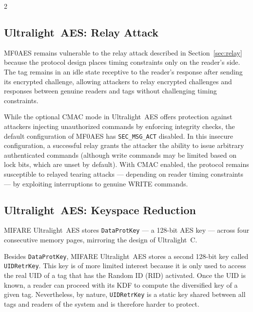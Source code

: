 \documentclass[10pt,letterpaper]{article}
\begin{document}
\begin{multicols}{2}
\subsection{Ultralight~AES: Relay Attack}
\label{sec:aesrelay}

MF0AES remains vulnerable to the relay attack described in Section~\ref{sec:relay} because the protocol design places timing constraints only on the reader's side. The tag remains in an idle state receptive to the reader's response after sending its encrypted challenge, allowing attackers to relay encrypted challenges and responses between genuine readers and tags without challenging timing constraints.

While the optional CMAC mode in Ultralight~AES offers protection against attackers injecting unauthorized commands by enforcing integrity checks, the default configuration of MF0AES has \texttt{SEC\_MSG\_ACT} disabled. In this insecure configuration, a successful relay grants the attacker the ability to issue arbitrary authenticated commands (although write commands may be limited based on lock bits, which are unset by default). With CMAC enabled, the protocol remains susceptible to relayed tearing attacks --- depending on reader timing constraints --- by exploiting interruptions to genuine WRITE commands.

\subsection{Ultralight~AES: Keyspace Reduction}
\label{sec:aes_ks_reduc}
MIFARE Ultralight~AES stores \texttt{DataProtKey} --- a 128-bit AES key --- across four consecutive memory pages, mirroring the design of Ultralight~C. 

Besides \texttt{DataProtKey}, MIFARE Ultralight~AES stores a second 128-bit key called \texttt{UIDRetrKey}. This key is of more limited interest because it is only used to access the real UID of a tag that has the Random ID (RID) activated. Once the UID is known, a reader can proceed with its KDF to compute the diversified key of a given tag. Nevertheless, by nature, \texttt{UIDRetrKey} is a static key shared between all tags and readers of the system and is therefore harder to protect.


\end{multicols}
\end{document}
